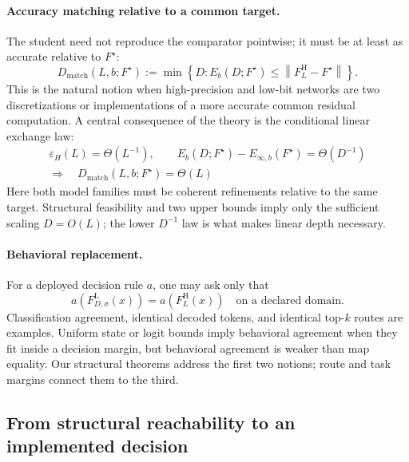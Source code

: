 \documentclass[twoside,11pt]{article}
\newcommand{\norm}[1]{\left\lVert #1\right\rVert}
\begin{document}
\paragraph{Accuracy matching relative to a common target.}
The student need not reproduce the comparator pointwise; it must be at least
as accurate relative to $F^\star$:
\begin{equation}
 D_{\mathrm{match}}(L,b;F^\star)
 :=\min\left\{D:
 E_b(D;F^\star)\le \norm{F_L^{\mathrm H}-F^\star}\right\}.
 \label{eq:matching-depth-intro}
\end{equation}
This is the natural notion when high-precision and low-bit networks are two
discretizations or implementations of a more accurate common residual
computation.  A central consequence of the theory is the conditional linear
exchange law:
\begin{equation}
\boxed{\begin{gathered}
\varepsilon_H(L)=\Theta(L^{-1}),\qquad
E_b(D;F^\star)-E_{\infty,b}(F^\star)=\Theta(D^{-1})\\
\Longrightarrow\quad D_{\mathrm{match}}(L,b;F^\star)=\Theta(L)
\end{gathered}}
\label{eq:linear-matching-law-intro}
\end{equation}
Here both model families must be coherent refinements relative to the same
target.  Structural feasibility and two upper bounds imply only the sufficient
scaling $D=O(L)$; the lower $D^{-1}$ law is what makes linear depth necessary.

\paragraph{Behavioral replacement.}
For a deployed decision rule $a$, one may ask only that
\begin{equation}
 a\left(F_{D,\sigma}^{\mathrm L}(x)\right)=a\left(F_L^{\mathrm H}(x)\right)
 \quad\text{on a declared domain.}
 \label{eq:behavioral-intro}
\end{equation}
Classification agreement, identical decoded tokens, and identical top-$k$
routes are examples.  Uniform state or logit bounds imply behavioral agreement
when they fit inside a decision margin, but behavioral agreement is weaker
than map equality.  Our structural theorems address the first two notions;
route and task margins connect them to the third.

\subsection{From structural reachability to an implemented decision}
\label{sec:resource-law-intro}
\end{document}
